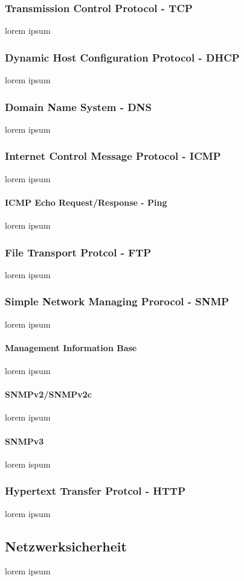 \documentclass[12pt,a4paper]{report}
\begin{document}
\subsubsection{Transmission Control Protocol - TCP}
lorem ipsum
\subsubsection{Dynamic Host Configuration Protocol - DHCP}
lorem ipsum
\subsubsection{Domain Name System - DNS}
lorem ipsum
\subsubsection{Internet Control Message Protocol - ICMP}
lorem ipsum 
\paragraph{ICMP Echo Request/Response - Ping}
lorem ipsum
\subsubsection{File Transport Protcol - FTP}
lorem ipsum
\subsubsection{Simple Network Managing Prorocol - SNMP}
lorem ipsum
\paragraph{Management Information Base}
lorem ipsum
\paragraph{SNMPv2/SNMPv2c}
lorem ipsum
\paragraph{SNMPv3}
lorem ispum
\subsubsection{Hypertext Transfer Protcol - HTTP}
lorem ipsum
\subsection{Netzwerksicherheit}
lorem ipsum
\end{document}
